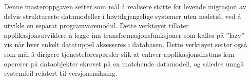 Denne masteroppgaven setter som mål å realisere støtte for levende migrasjon av delvis strukturerte datamodeller i høytilgjengelige systemer uten nedetid, ved å utvikle en separat programvaremodul. Dette verktøyet tillater applikasjonsutviklere å legge inn transformasjonsfunksjoner som kalles på ''lazy'' vis når hver enkelt datatuppel aksesseres i databasen. Dette verktøyet setter også som mål å dirigere tjenesteforespørsler slik at enhver applikasjonsinstans kun opererer på dataobjekter skrevet på en matchende datamodell, og således unngå systemfeil relatert til versjonsmiksing.

\clearpage
